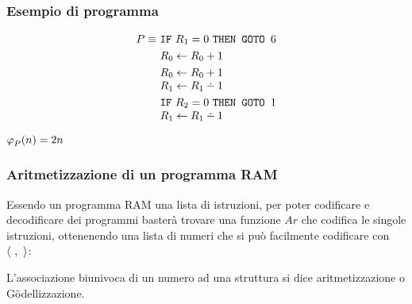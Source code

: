 \subsubsection*{Esempio di programma}
\vspace{-1em}
\begin{minipage}{.48\textwidth}
    \begin{align}
        P \equiv\ & \goto{R_1}{6}       \notag\\
        & R_0 \leftarrow R_0+1          \notag\\
        & R_0 \leftarrow R_0+1          \notag\\[-.3em]
        & R_1 \leftarrow R_1\dotminus 1 \notag\\
        & \goto{R_2}{1}                 \notag\\[-.3em]
        & R_1 \leftarrow R_1\dotminus 1 \notag
    \end{align}
\end{minipage}
\begin{minipage}{.48\textwidth}
    $ \semanticaRAM_P(n) = 2n $
\end{minipage}

\subsubsection*{Aritmetizzazione di un programma RAM}
Essendo un programma RAM una lista di istruzioni, per poter codificare e decodificare
dei programmi basterà trovare una funzione $Ar$ che codifica le singole istruzioni, 
ottenenendo una lista di numeri che si può facilmente codificare con $\cantor{\ ,\ }$:
\begin{figure}[H]
    \centering
    
\end{figure}

L'associazione biunivoca di un numero ad una struttura si dice aritmetizzazione o
Gödellizzazione.

